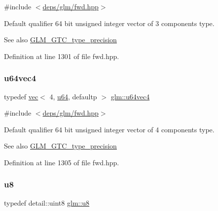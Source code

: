{\ttfamily \#include $<$\hyperlink{fwd_8hpp}{deps/glm/fwd.\+hpp}$>$}

Default qualifier 64 bit unsigned integer vector of 3 components type. \begin{DoxySeeAlso}{See also}
\hyperlink{group__gtc__type__precision}{G\+L\+M\+\_\+\+G\+T\+C\+\_\+type\+\_\+precision} 
\end{DoxySeeAlso}


Definition at line 1301 of file fwd.\+hpp.

\mbox{\label{group__gtc__type__precision_ga70396c4f422824503c870db50b3059fd}} 
\subsubsection{\texorpdfstring{u64vec4}{u64vec4}}
{\footnotesize\ttfamily typedef \hyperlink{structglm_1_1vec}{vec}$<$ 4, \hyperlink{group__gtc__type__precision_ga71cedd4972f9cb1a5e14dfe5ab83ecd7}{u64}, defaultp $>$ \hyperlink{group__gtc__type__precision_ga70396c4f422824503c870db50b3059fd}{glm\+::u64vec4}}



{\ttfamily \#include $<$\hyperlink{fwd_8hpp}{deps/glm/fwd.\+hpp}$>$}

Default qualifier 64 bit unsigned integer vector of 4 components type. \begin{DoxySeeAlso}{See also}
\hyperlink{group__gtc__type__precision}{G\+L\+M\+\_\+\+G\+T\+C\+\_\+type\+\_\+precision} 
\end{DoxySeeAlso}


Definition at line 1305 of file fwd.\+hpp.

\mbox{\label{group__gtc__type__precision_ga5e3dc67373d5068997d2d9f41c9024d2}} 
\subsubsection{\texorpdfstring{u8}{u8}}
{\footnotesize\ttfamily typedef detail\+::uint8 \hyperlink{group__gtc__type__precision_ga5e3dc67373d5068997d2d9f41c9024d2}{glm\+::u8}}




